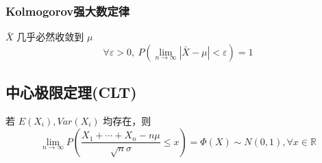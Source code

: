 \documentclass[./main.tex]{subfiles}
\begin{document}
\subsubsection{Kolmogorov强大数定律}
$\bar{X}$ 几乎必然收敛到 $\mu$
\begin{equation}
    \forall\varepsilon>0,\ P(\lim\limits_{n\rightarrow\infty}|\bar{X}-\mu|<\varepsilon)=1
\end{equation}
\subsection{中心极限定理(CLT)}
若 $E(X_i),Var(X_i)$ 均存在，则
\begin{equation}
    \lim\limits_{n\rightarrow\infty}P(\frac{X_1+\cdots+X_n-n\mu}{\sqrt{n}\sigma}\le x)=\Phi(X)\sim N(0,1),\forall x\in\mathbb{R}
\end{equation}
\end{document}

